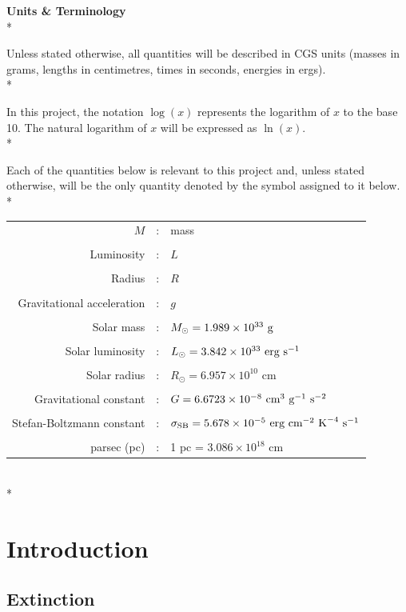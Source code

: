 \documentclass[12pt, a4paper]{report}
\begin{document}
\textbf{Units \& Terminology}\\*

Unless stated otherwise, all quantities will be described in CGS units (masses in grams, lengths in centimetres, times in seconds, energies in ergs). \\*

In this project, the notation $\log(x)$ represents the logarithm of $x$ to the base 10. The natural logarithm of $x$ will be expressed as $\ln(x)$. \\*

Each of the quantities below is relevant to this project and, unless stated otherwise, will be the only quantity denoted by the symbol assigned to it below.\\* 

\begin{tabular}{r@{ }c@{ }l}
$M$ &:& mass\\
\\
Luminosity &:& $L$ \\
\\
Radius &:& $R$ \\
\\
Gravitational acceleration &:& $g$ \\
\\
Solar mass &:& $M_{\odot} = 1.989 \times 10^{33} \textnormal{ g}$ \\
\\
Solar luminosity &:& $L_{\odot} = 3.842 \times 10^{33} \textnormal{ erg s}^{-1}$ \\
\\
Solar radius &:& $R_{\odot} = 6.957 \times 10^{10}$ cm \\
\\
Gravitational constant &:& $G = 6.6723 \times 10^{-8} \textnormal{ cm}^{3} \textnormal{ g}^{-1} \textnormal{ s}^{-2}$ \\
\\
Stefan-Boltzmann constant &:& $\sigma_{\textnormal{SB}} = 5.678 \times 10^{-5} \textnormal{ erg cm}^{-2} \textnormal{ K}^{-4} \textnormal{ s}^{-1}$ \\
\\
parsec (pc) &:& 1 pc = $3.086 \times 10^{18}$ cm
\end{tabular}
\\*

\chapter{Introduction}
\section{Extinction} \label{ext_def}
\end{document}
